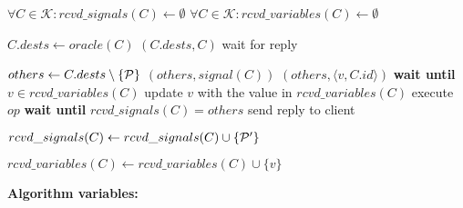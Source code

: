 \begin{algorithm}[h!]
\small

\begin{distribalgo}[1]

\vspace{1mm}

    \STATE $\forall C \in \mathcal{K} : rcvd\_signals(C) \leftarrow \emptyset$
    \STATE $\forall C \in \mathcal{K} : rcvd\_variables(C) \leftarrow \emptyset$
\ENDINDENT

\vspace{1.25mm}
    \STATE $C.dests \leftarrow oracle(C)$ \label{algline:oracle} 
	\STATE \amcast$(C.dests, C)$ \label{algline:climcast}
	\STATE wait for reply
\ENDINDENT

\vspace{1.25mm}
	    \STATE $others \leftarrow C.dests \setminus \{\mathcal{P}{}\}$
	    \STATE \rmcast$(others, signal(C))$ \label{algline:mcastsignals}
			        \STATE \rmcast$(others, \langle v, C.id \rangle)$ \label{algline:multicastv}
			    \ELSE
			        \STATE \textbf{wait until} $v \in rcvd\_variables(C)$ \label{algline:waitvariable}
			        \STATE update $v$ with the value in $rcvd\_variables(C)$
			    \ENDIF
			\ENDIF
			\STATE execute $op$ \label{algline:executeopck}
		\ENDFOR
		\STATE \textbf{wait until} $rcvd\_signals(C) = others$ \label{algline:waitsignals}
		\STATE send reply to client \label{algline:sendreply}
	\ENDINDENT
	
	\vspace{1.25mm}
	    \STATE $rcvd\_signals(C) \leftarrow rcvd\_signals(C) \cup \{\mathcal{P}'\}$
	\ENDINDENT

	\vspace{1.25mm}
	    \STATE $rcvd\_variables(C) \leftarrow rcvd\_variables(C) \cup \{v\}$
	\ENDINDENT
			
\ENDINDENT

\vspace{1.7mm}

\textbf{Algorithm variables:}

\vspace{1.25mm}


\end{distribalgo}
\end{algorithm}
